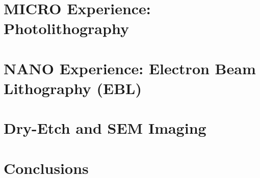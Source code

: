 \documentclass{report}
\begin{document}
\section{MICRO Experience: Photolithography}



\section{NANO Experience: Electron Beam Lithography (EBL)}



\section{Dry-Etch and SEM Imaging}



\section{Conclusions}



\end{document}
